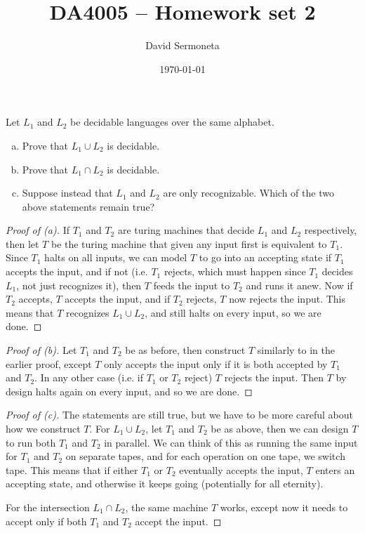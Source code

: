 \documentclass[11pt,a4paper]{article}
\title{DA4005 -- Homework set 2}
\author{David Sermoneta}
\date{\today}
\begin{document}
\maketitle
\begin{assignment}
 Let $L_1$ and $L_2$ be decidable languages over the same alphabet.
\begin{enumerate}[(a)]
 \item Prove that $L_1 \cup  L_2$ is decidable.
 \item Prove that $L_1\cap L_2$ is decidable.
 \item Suppose instead that $L_1$ and $L_2$ are only recognizable. Which of the two above statements remain true?
\end{enumerate}
\begin{proof}[Proof of (a)]
 If $T_1$ and $T_2$ are turing machines that decide $L_1$ and $L_2$ respectively, then let $T$ be the turing machine that given any input first is equivalent to $T_1$. Since $T_1$ halts on all inputs, we can model $T$ to go into an accepting state if $T_1$ accepts the input, and if not (i.e. $T_1$ rejects, which must happen since $T_1$ decides $L_1$, not just recognizes it), then $T$ feeds the input to $T_2$ and runs it anew. Now if $T_2$ accepts, $T$ accepts the input, and if $T_2$ rejects, $T$ now rejects the input. This means that $T$ recognizes $L_1\cup L_2$, and still halts on every input, so we are done.
\end{proof}

\begin{proof}[Proof of (b)]
 Let $T_1$ and $T_2$ be as before, then construct $T$ similarly to in the earlier proof, except $T$ only accepts the input only if it is both accepted by $T_1$ and $T_2$. In any other case (i.e. if $T_1$ or $T_2$ reject) $T$ rejects the input. Then $T$ by design halts again on every input, and so we are done.
\end{proof}

\begin{proof}[Proof of (c)]
 The statements are still true, but we have to be more careful about how we construct $T$. For $L_1 \cup L_2$, let $T_1$ and $T_2$ be as above, then we can design $T$ to run both $T_1$ and $T_2$ in parallel. We can think of this as running the same input for $T_1$ and $T_2$ on separate tapes, and for each operation on one tape, we switch tape. This means that if either $T_1$ or $T_2$ eventually accepts the input, $T$ enters an accepting state, and otherwise it keeps going (potentially for all eternity).

For the intersection $L_1\cap L_2$, the same machine $T$ works, except now it needs to accept only if both $T_1$  and $T_2$ accept the input. 
\end{proof}
\end{assignment}
\end{document}
